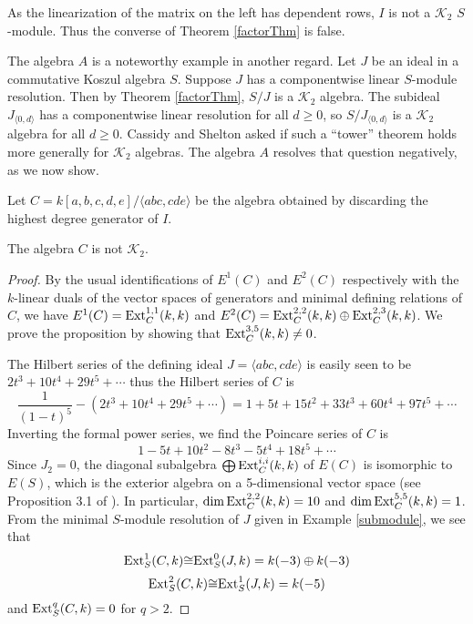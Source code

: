 \documentclass[11pt,righttag]{amsart}
\begin{document}
\begin{example}
As the linearization of the matrix on the left has dependent rows, $I$ is not a ${{\mathcal K}}_2$ $S$-module. Thus the converse of Theorem \ref{factorThm} is false. 

The algebra $A$ is a noteworthy example in another regard. Let $J$ be an ideal in a commutative Koszul algebra $S$. Suppose $J$ has a componentwise linear $S$-module resolution. Then by Theorem \ref{factorThm}, $S/J$ is a ${{\mathcal K}}_2$ algebra. The subideal $J_{{\langle} 0, d{\rangle}}$ has a componentwise linear resolution for all $d\ge 0$, so $S/J_{{\langle} 0,d{\rangle}}$ is a  ${{\mathcal K}}_2$ algebra for all $d\ge 0$.  Cassidy and Shelton asked if such a ``tower'' theorem holds more generally for ${{\mathcal K}}_2$ algebras. The algebra $A$ resolves that question negatively, as we now show.

Let $C=k[a,b,c,d,e]/{\langle} abc, cde{\rangle}$ be the algebra obtained by discarding the highest degree generator of $I$.

\begin{prop}
The algebra $C$ is not ${{\mathcal K}}_2$.
\end{prop}

\begin{proof}
By the usual identifications of $E^1(C)$ and $E^2(C)$ respectively with the $k$-linear duals of the vector spaces of generators and minimal defining relations of $C$, we have $E^1(C)={\hbox{{\rm Ext}}}_C^{1,1}(k,k)$ and $E^2(C)={\hbox{{\rm Ext}}}_C^{2,2}(k,k)\oplus{\hbox{{\rm Ext}}}_C^{2,3}(k,k)$. 
We prove the proposition by showing that ${\hbox{{\rm Ext}}}^{3,5}_C(k,k)\neq 0$. 

The Hilbert series of the defining ideal $J={\langle} abc, cde{\rangle}$ is easily seen to be $2t^3+10t^4+29t^5+\cdots$ thus the Hilbert series of $C$ is $$\dfrac{1}{(1-t)^5}-(2t^3+10t^4+29t^5+\cdots)=1+5t+15t^2+33t^3+60t^4+97t^5+\cdots$$
Inverting the formal power series, we find the Poincare series of $C$ is
$$1-5t+10t^2-8t^3-5t^4+18t^5+\cdots$$
Since $J_2=0$, the diagonal subalgebra $\bigoplus {\hbox{{\rm Ext}}}_C^{i,i}(k,k)$ of $E(C)$ is isomorphic to $E(S)$, which is the exterior algebra on a 5-dimensional vector space (see Proposition 3.1 of \cite{PP}). In particular, $\dim{\hbox{{\rm Ext}}}_C^{2,2}(k,k)=10$ and $\dim {\hbox{{\rm Ext}}}_C^{5,5}(k,k)=1$. 
From the minimal $S$-module resolution of $J$ given in Example \ref{submodule}, we see that $${\hbox{{\rm Ext}}}_S^1(C,k){\cong} {\hbox{{\rm Ext}}}_S^0(J,k)=k(-3)\oplus k(-3)$$  
$${\hbox{{\rm Ext}}}_S^2(C,k){\cong}{\hbox{{\rm Ext}}}_S^1(J,k)=k(-5)$$ and ${\hbox{{\rm Ext}}}_S^q(C,k)=0$ for $q>2$.


\end{proof}
\end{example}
\end{document}
